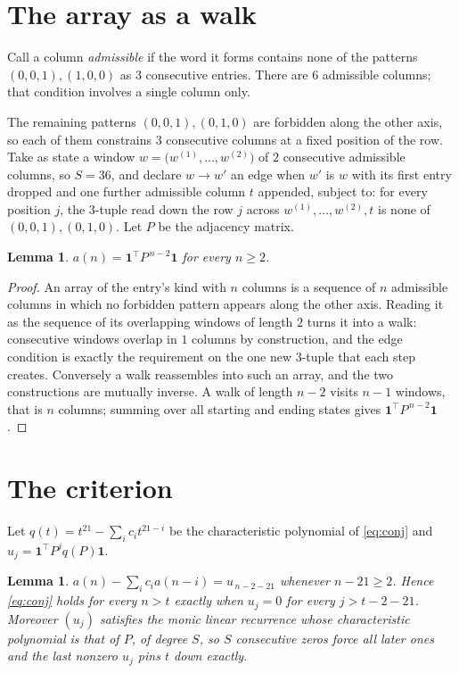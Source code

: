 \documentclass[11pt,a4paper]{article}
\theoremstyle{plain}
\newtheorem{lemma}[theorem]{Lemma}
\theoremstyle{definition}
\begin{document}
\section{The array as a walk}

Call a column \emph{admissible} if the word it forms contains none of the patterns
$(0,0,1), (1,0,0)$ as $3$ consecutive entries. There are $6$ admissible columns; that condition
involves a single column only.

The remaining patterns $(0,0,1), (0,1,0)$ are forbidden along the other axis, so each of them
constrains $3$ consecutive columns at a fixed position of the row. Take as state a
window $w=\bigl(w^{(1)},\dots,w^{(2)}\bigr)$ of $2$ consecutive admissible
columns, so $S=36$, and declare $w\to w'$ an edge when $w'$ is $w$ with its first entry
dropped and one further admissible column $t$ appended, subject to: for every position
$j$, the $3$-tuple read down the row $j$ across $w^{(1)},\dots,w^{(2)},t$
is none of $(0,0,1), (0,1,0)$. Let $P$ be the adjacency matrix.

\begin{lemma}\label{lem:walk}
$a(n)=\mathbf{1}^{\!\top}P^{\,n-2}\mathbf{1}$ for every $n\ge2$.
\end{lemma}

\begin{proof}
An array of the entry's kind with $n$ columns is a sequence of $n$ admissible columns in
which no forbidden pattern appears along the other axis. Reading it as the sequence of its
overlapping windows of length $2$ turns it into a walk: consecutive windows overlap in
$1$ columns by construction, and the edge condition is exactly the requirement on the one
new $3$-tuple that each step creates. Conversely a walk reassembles into such an array,
and the two constructions are mutually inverse. A walk of length $n-2$ visits $n-1$
windows, that is $n$ columns; summing over all starting and ending states gives
$\mathbf{1}^{\!\top}P^{\,n-2}\mathbf{1}$.
\end{proof}

\section{The criterion}

Let $q(t)=t^{21}-\sum_i c_i t^{21-i}$ be the characteristic polynomial of
\eqref{eq:conj} and $u_j=\mathbf{1}^{\!\top}P^{j}q(P)\mathbf{1}$.

\begin{lemma}\label{lem:crit}
$a(n)-\sum_i c_i a(n-i)=u_{\,n-2-21}$ whenever $n-21\ge2$. Hence
\eqref{eq:conj} holds for every $n>t$ exactly when $u_j=0$ for every
$j>t-2-21$. Moreover $(u_j)$ satisfies the monic linear recurrence whose
characteristic polynomial is that of $P$, of degree $S$, so $S$ consecutive zeros force all
later ones and the last nonzero $u_j$ pins $t$ down exactly.
\end{lemma}
\end{document}
